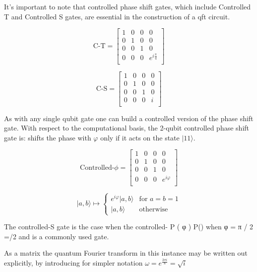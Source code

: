 \documentclass[inscr,ack,preface]{diphdthesis}
\begin{document}
It's important to note that controlled phase shift gates, which include Controlled T and Controlled S gates, are essential in the construction of a \acrshort{qft} circuit.

\[
\text{C-T} =
\begin{bmatrix}
    1 & 0 & 0 & 0 \\
    0 & 1 & 0 & 0 \\
    0 & 0 & 1 & 0 \\
    0 & 0 & 0 & e^{i\frac{\pi}{4}} \\
\end{bmatrix}
\]

\[
\text{C-S} =
\begin{bmatrix}
    1 & 0 & 0 & 0 \\
    0 & 1 & 0 & 0 \\
    0 & 0 & 1 & 0 \\
    0 & 0 & 0 & i \\
\end{bmatrix}
\]

As with any single \acrshort{qubit} gate one can build a controlled version of the phase shift gate. With respect to the computational basis, the 2-\acrshort{qubit} controlled phase shift gate is: shifts the phase with $\varphi$ only if it acts on the state $|11\rangle$.


\[
\text{Controlled-}\phi =
\begin{bmatrix}
    1 & 0 & 0 & 0 \\
    0 & 1 & 0 & 0 \\
    0 & 0 & 1 & 0 \\
    0 & 0 & 0 & e^{i\varphi} \\
\end{bmatrix}
\]


\[
|a,b\rangle \mapsto
\begin{cases}
e^{i\varphi}|a,b\rangle & \text{for } a=b=1 \\
|a,b\rangle & \text{otherwise}
\end{cases}
\]



The controlled-S gate is the case when the controlled- P ( φ ) {\displaystyle P(\varphi )} when φ = π / 2 {\displaystyle \varphi =\pi /2} and is a commonly used gate.\cite{niel}

\cite{cphase}


As a matrix the quantum Fourier transform in this instance may be written out explicitly, by introducing for simpler notation \Large$\omega= e^{\frac{2\pi i}{8}} = \sqrt{i}$ \normalsize \cite{niel}
\end{document}
